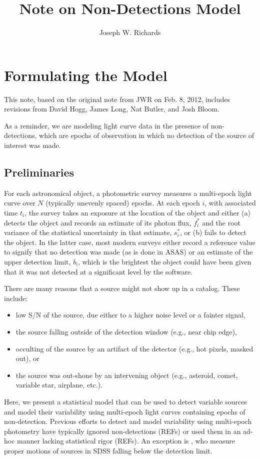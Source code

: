 \documentclass[12pt,preprint]{aastex}
\newcommand{\fobs}{f_i^*}
\newcommand{\sobs}{s_i^*}
\begin{document}

\shortauthors{}
\title{Note on Non-Detections Model}
\author{
Joseph W. Richards
}



\section{Formulating the Model}
\label{sec:model}

This note, based on the original note from JWR on Feb. 8, 2012, includes revisions from David Hogg, James Long, Nat Butler, and Josh Bloom.

As a reminder, we are modeling light curve data in the presence of non-detections, which are epochs of observation in which no detection of the source of interest was made.

\subsection{Preliminaries}
\label{ss:prelim}

For each astronomical object, a photometric survey measures a multi-epoch light curve over $N$ (typically unevenly spaced) epochs.  At each epoch $i$, with associated time $t_i$, the survey takes an exposure at the location of the object and either (a) detects the object and records an estimate of its photon flux, $\fobs$ and the root variance of the statistical uncertainty in that estimate, $\sobs$, or (b) fails to detect the object.  In the latter case, most modern surveys either record a reference value to signify that no detection was made (as is done in ASAS) or an estimate of the upper detection limit, $b_i$, which is the brightest the object could have been given that it was not detected at a significant level by the software.

There are many reasons that a source might not show up in a catalog.  These include:
\begin{itemize}
\item low S/N of the source, due either to a higher noise level or a fainter signal,
\item the source falling outside of the detection window (e.g., near chip edge),
\item occulting of the source by an artifact of the detector (e.g., hot pixels, masked out), or
\item the source was out-shone by an intervening object (e.g., asteroid, comet, variable star, airplane, etc.).
\end{itemize}
Here, we present a statistical model that can be used to detect variable sources and model their variability using multi-epoch light curves containing epochs of non-detection.  Previous efforts to detect and model variability using multi-epoch photometry have typically ignored non-detections (REFs) or used them in an ad-hoc manner lacking statistical rigor (REFs).  An exception is \citet{2009AJ....137.4400L}, who measure proper motions of sources in SDSS falling below the detection limit.
\end{document}
